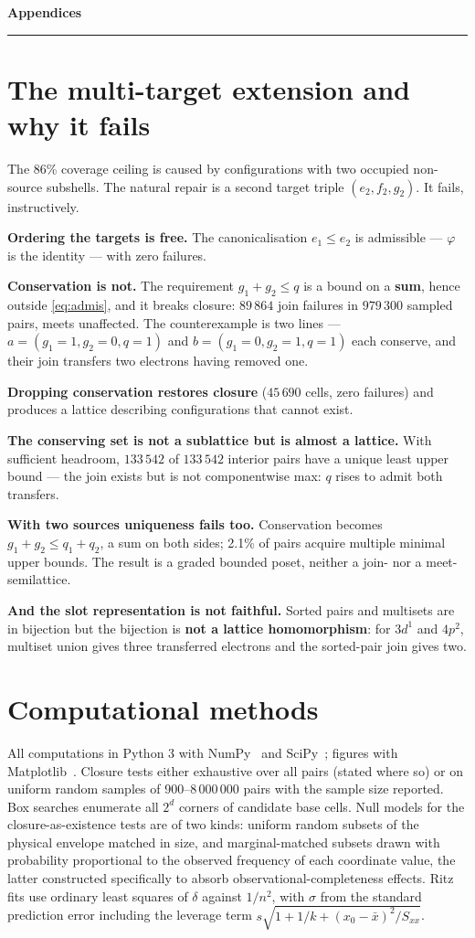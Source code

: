 \documentclass[11pt,a4paper]{article}
\newcommand{\parttitle}[1]{%
  \vspace{1.2\baselineskip}%
  {\noindent\LARGE\bfseries\color{acc} #1\par}%
  \vspace{0.4\baselineskip}\noindent\textcolor{acc}{\rule{\linewidth}{0.8pt}}%
  \vspace{0.6\baselineskip}\par}
\theoremstyle{definition}
\begin{document}
\appendix
\parttitle{Appendices}

\section{The multi-target extension and why it fails}
\label{app:multi}
The 86\% coverage ceiling is caused by configurations with two occupied
non-source subshells. The natural repair is a second target triple
$(e_2,f_2,g_2)$. It fails, instructively.

\textbf{Ordering the targets is free.} The canonicalisation $e_1\le e_2$ is
admissible --- $\varphi$ is the identity --- with zero failures.

\textbf{Conservation is not.} The requirement $g_1+g_2\le q$ is a bound on a
\textbf{sum}, hence outside \eqref{eq:admis}, and it breaks closure: $89\,864$
join failures in $979\,300$ sampled pairs, meets unaffected. The counterexample
is two lines --- $a=(g_1{=}1,g_2{=}0,q{=}1)$ and $b=(g_1{=}0,g_2{=}1,q{=}1)$
each conserve, and their join transfers two electrons having removed one.

\textbf{Dropping conservation restores closure} ($45\,690$ cells, zero failures)
and produces a lattice describing configurations that cannot exist.

\textbf{The conserving set is not a sublattice but is almost a lattice.} With
sufficient headroom, $133\,542$ of $133\,542$ interior pairs have a unique least
upper bound --- the join exists but is not componentwise max: $q$ rises to admit
both transfers.

\textbf{With two sources uniqueness fails too.} Conservation becomes
$g_1+g_2\le q_1+q_2$, a sum on both sides; 2.1\% of pairs acquire multiple
minimal upper bounds. The result is a graded bounded poset, neither a join- nor
a meet-semilattice.

\textbf{And the slot representation is not faithful.} Sorted pairs and multisets
are in bijection but the bijection is \textbf{not a lattice homomorphism}: for
$3d^{1}$ and $4p^{2}$, multiset union gives three transferred electrons and the
sorted-pair join gives two.

\section{Computational methods}
All computations in Python 3 with NumPy~\cite{numpy} and SciPy~\cite{scipy};
figures with Matplotlib~\cite{matplotlib}. Closure tests either exhaustive over
all pairs (stated where so) or on uniform random samples of 900--8\,000\,000
pairs with the sample size reported. Box searches enumerate all $2^{d}$ corners
of candidate base cells. Null models for the closure-as-existence tests are of
two kinds: uniform random subsets of the physical envelope matched in size, and
marginal-matched subsets drawn with probability proportional to the observed
frequency of each coordinate value, the latter constructed specifically to
absorb observational-completeness effects. Ritz fits use ordinary least squares
of $\delta$ against $1/n^{2}$, with $\sigma$ from the standard prediction error
including the leverage term
$s\sqrt{1+1/k+(x_0-\bar{x})^{2}/S_{xx}}$.
\end{document}
